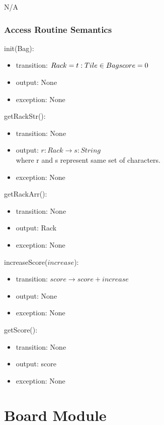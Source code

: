 \documentclass[12pt]{article}
\begin{document}
N/A

\begin{itemize}

\end{itemize}

\subsubsection* {Access Routine Semantics}

\noindent init(Bag):
\begin{itemize}
\item transition: $Rack = {t : Tile \in Bag}\\
score = 0$
\item output: None
\item exception: None
\end{itemize}

\noindent getRackStr():
\begin{itemize}
\item transition: None
\item output: $r:Rack \rightarrow s:String$ \\
where r and s represent same set of characters.
\item exception: None
\end{itemize}

\noindent getRackArr():
\begin{itemize}
\item transition: None
\item output: Rack
\item exception: None
\end{itemize}

\noindent increaseScore($increase$):
\begin{itemize}
\item transition: $score \rightarrow score+increase$
\item output: None
\item exception: None
\end{itemize}

\noindent getScore():
\begin{itemize}
\item transition: None
\item output: score
\item exception: None
\end{itemize}

\newpage

\section* {Board Module}
\end{document}
